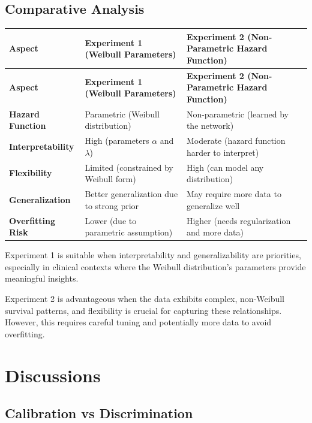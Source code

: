 \documentclass{article}
\begin{document}
\subsection{Comparative Analysis}
\begin{longtable}{|>{\raggedright\arraybackslash}p{5cm}|>{\raggedright\arraybackslash}p{6cm}|>{\raggedright\arraybackslash}p{6cm}|}
\hline
\textbf{Aspect} & \textbf{Experiment 1 (Weibull Parameters)} & \textbf{Experiment 2 (Non-Parametric Hazard Function)} \\
\hline
\endfirsthead

\hline
\textbf{Aspect} & \textbf{Experiment 1 (Weibull Parameters)} & \textbf{Experiment 2 (Non-Parametric Hazard Function)} \\
\hline
\endhead

\hline
\endfoot

\hline
\endlastfoot

\textbf{Hazard Function} & Parametric (Weibull distribution) & Non-parametric (learned by the network) \\
\hline
\textbf{Interpretability} & High (parameters $\alpha$ and $\lambda$) & Moderate (hazard function harder to interpret) \\
\hline
\textbf{Flexibility} & Limited (constrained by Weibull form) & High (can model any distribution) \\
\hline
\textbf{Generalization} & Better generalization due to strong prior & May require more data to generalize well \\
\hline
\textbf{Overfitting Risk} & Lower (due to parametric assumption) & Higher (needs regularization and more data) \\
\hline
\end{longtable}



Experiment 1 is suitable when interpretability and generalizability are priorities, especially in clinical contexts where the Weibull distribution's parameters provide meaningful insights. 

Experiment 2 is advantageous when the data exhibits complex, non-Weibull survival patterns, and flexibility is crucial for capturing these relationships. However, this requires careful tuning and potentially more data to avoid overfitting.

\section{Discussions}
\subsection{Calibration vs Discrimination}
\end{document}
